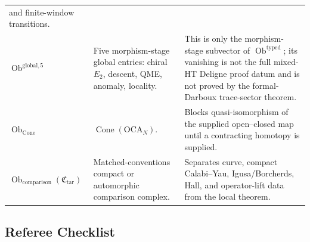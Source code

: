 \begin{center}
\begin{tabular}{@{}>{\raggedright\arraybackslash}p{}
  >{\raggedright\arraybackslash}p{}
  >{\raggedright\arraybackslash}p{}@{}}
and finite-window transitions. \\
\(\operatorname{Ob}^{\mathrm{global},5}\) &
Five morphism-stage global entries:
chiral \(E_2\), descent, QME, anomaly, locality. &
This is only the morphism-stage subvector of
\(\operatorname{Ob}^{\mathrm{typed}}\); its vanishing is not the full
mixed-HT Deligne proof datum and is not proved by the formal-Darboux
trace-sector theorem. \\
\(\operatorname{Ob}_{\operatorname{Cone}}\) &
\(\operatorname{Cone}(\mathrm{OCA}_N)\). &
Blocks quasi-isomorphism of the supplied open--closed map until a
contracting homotopy is supplied. \\
\(\operatorname{Ob}_{\mathrm{comparison}}(\mathfrak C_{\mathrm{tar}})\) &
Matched-conventions compact or automorphic comparison complex. &
Separates curve, compact Calabi--Yau, Igusa/Borcherds, Hall, and
operator-lift data from the local theorem. \\
\end{tabular}
\end{center}

\subsection{Referee Checklist}

